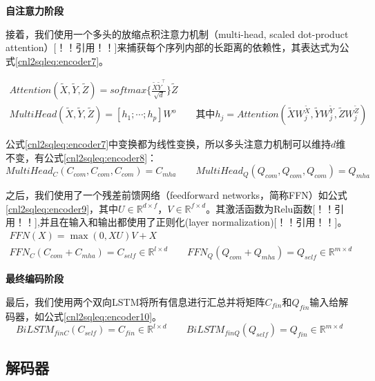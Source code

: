 \textbf{自注意力阶段}

接着，我们使用一个多头的放缩点积注意力机制（multi-head, scaled dot-product attention）[！！引用！！]来捕获每个序列内部的长距离的依赖性，其表达式为公式\ref{cnl2sqleq:encoder7}。

\begin{gather}
  \label{cnl2sqleq:encoder7}
  Attention(\widetilde{X},\widetilde{Y},\widetilde{Z}) = softmax\{\frac{\widetilde{X}\widetilde{Y}^{\top}}{\sqrt{d}}\} \widetilde{Z}\\
  MultiHead(\widetilde{X},\widetilde{Y},\widetilde{Z}) = [h_1;\cdots;h_p]W^o \qquad \mbox{其中}h_j= Attention(\widetilde{X}W^{\widetilde{X}}_j,\widetilde{Y}W^{\widetilde{Y}}_j,\widetilde{Z}W^{\widetilde{Z}}_j)
\end{gather}

公式\ref{cnl2sqleq:encoder7}中变换都为线性变换，所以多头注意力机制可以维持$d$维不变，有公式\ref{cnl2sqleq:encoder8}：
\begin{equation}
  \label{cnl2sqleq:encoder8}
  MultiHead_C(C_{com},C_{com},C_{com}) = C_{mha} \qquad MultiHead_Q(Q_{com},Q_{com},Q_{com}) = Q_{mha}
 \end{equation}

之后，我们使用了一个残差前馈网络（feedforward networks，简称FFN）如公式\ref{cnl2sqleq:encoder9}，其中$U \in \mathbb{R}^{d \times f}$，$V \in \mathbb{R}^{f \times d}$。其激活函数为Relu函数[！！引用！！],并且在输入和输出都使用了正则化(layer normalization)[！！引用！！]。
\begin{gather}
  \label{cnl2sqleq:encoder9}
  FFN(X) = \max(0,XU)V + X\\
  FFN_C(C_{com} + C_{mha}) = C_{self} \in \mathbb{R}^{l \times d} \qquad FFN_Q(Q_{com} + Q_{mha}) = Q_{self} \in \mathbb{R}^{m \times d}
\end{gather}

\textbf{最终编码阶段}

最后，我们使用两个双向LSTM将所有信息进行汇总并将矩阵$C_{fin}$和$Q_{fin}$输入给解码器，如公式\ref{cnl2sqleq:encoder10}。
\begin{equation}
  \label{cnl2sqleq:encoder10}
  BiLSTM_{finC}(C_{self}) = C_{fin} \in \mathbb{R}^{l \times d} \qquad BiLSTM_{finQ}(Q_{self}) = Q_{fin} \in \mathbb{R}^{m \times d} 
\end{equation}


\subsection{解码器}
\label{cnl2sql:decoder}

